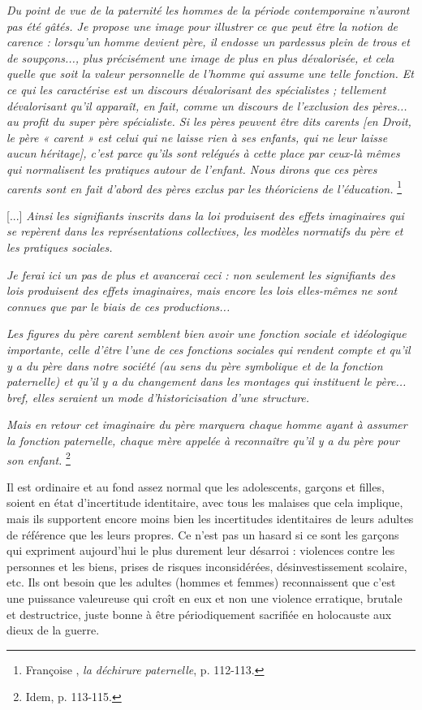 \begin{displayquote} 
\emph{Du point de vue de la paternité les hommes de la période contemporaine n'auront pas été gâtés. Je propose une image pour illustrer ce que peut être la notion de carence : lorsqu'un homme devient père, il endosse un pardessus plein de trous et de soupçons..., plus précisément une image de plus en plus dévalorisée, et cela quelle que soit la valeur personnelle de l'homme qui assume une telle fonction. Et ce qui les caractérise est un discours dévalorisant des spécialistes ; tellement dévalorisant qu'il apparaît, en fait, comme un discours de l'exclusion des pères... au profit du super père spécialiste. Si les pères peuvent être dits carents \emph{[en Droit, le père « carent » est celui qui ne laisse rien à ses enfants, qui ne leur laisse aucun héritage]}, c'est parce qu'ils sont relégués à cette place par ceux-là mêmes qui normalisent les pratiques autour de l'enfant. Nous dirons que ces pères carents sont en fait d'abord des pères exclus par les théoriciens de l'éducation.}%
\footnote{Françoise , \emph{la déchirure paternelle}, p. 112-113.} 

[...] \emph{Ainsi les signifiants inscrits dans la loi produisent des effets imaginaires qui se repèrent dans les représentations collectives, les modèles normatifs du père et les pratiques sociales.} 

\emph{Je ferai ici un pas de plus et avancerai ceci : non seulement les signifiants des lois produisent des effets imaginaires, mais encore les lois elles-mêmes ne sont connues que par le biais de ces productions...}

\emph{Les figures du père carent semblent bien avoir une fonction sociale et idéologique importante, celle d'être l'une de ces fonctions sociales qui rendent compte et qu'il y a du père dans notre société (au sens du père symbolique et de la fonction paternelle) et qu'il y a du changement dans les montages qui instituent le père... bref, elles seraient un mode d'historicisation d'une structure.}

\emph{Mais en retour cet imaginaire du père marquera chaque homme ayant à assumer la fonction paternelle, chaque mère appelée à reconnaître qu'il y a du père pour son enfant.}%
\footnote{Idem, p. 113-115.}
\end{displayquote}

 Il est ordinaire et au fond assez normal que les adolescents, garçons et filles, soient en état d'incertitude identitaire, avec tous les malaises que cela implique, mais ils supportent encore moins bien les incertitudes identitaires de leurs adultes de référence que les leurs propres. Ce n'est pas un hasard si ce sont les garçons qui expriment aujourd'hui le plus durement leur désarroi : violences contre les personnes et les biens, prises de risques inconsidérées, désinvestissement scolaire, etc. Ils ont besoin que les adultes (hommes et femmes) reconnaissent que c'est une puissance valeureuse qui croît en eux et non une violence erratique, brutale et destructrice, juste bonne à être périodiquement sacrifiée en holocauste aux dieux de la guerre.

